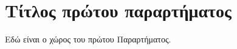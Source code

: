 \chapter{Τίτλος πρώτου παραρτήματος}
\label{app:FirstAppendix}
\minitoc

Εδώ είναι ο χώρος του πρώτου Παραρτήματος.